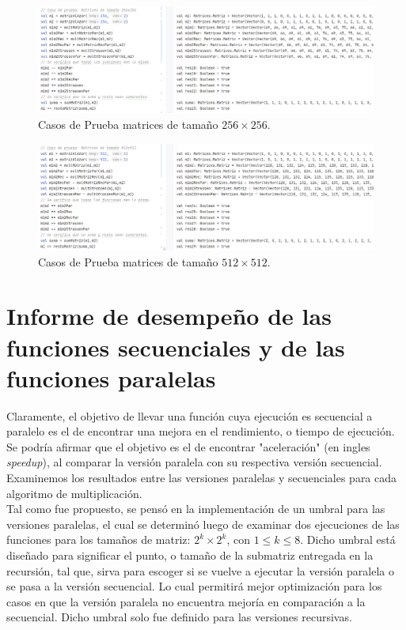 \documentclass{article}
\begin{document}
\begin{figure}[h]
    \begin{minipage}{1\textwidth}
        \centering
        \includegraphics[scale=0.52]{Pruebas4.png}
        \caption{Casos de Prueba matrices de tamaño \(256 \times 256\).}
        \label{1}
    \end{minipage}
\end{figure}

\begin{figure}[h]
    \begin{minipage}{1\textwidth}
        \centering
        \includegraphics[scale=0.52]{Pruebas5.png}
        \caption{Casos de Prueba matrices de tamaño \(512 \times 512\).}
        \label{1}
    \end{minipage}
\end{figure}

\clearpage 
\section{Informe de desempeño de las funciones secuenciales y de las funciones paralelas}

Claramente, el objetivo de llevar una función cuya ejecución es secuencial a paralelo es el de encontrar una mejora en el rendimiento, o tiempo de ejecución. Se podría afirmar que el objetivo es el de encontrar "aceleración" (en ingles \textit{speedup}), al comparar la versión paralela con su respectiva versión secuencial. Examinemos los resultados entre las versiones paralelas y secuenciales para cada algoritmo de multiplicación. \\

Tal como fue propuesto, se pensó en la implementación de un umbral para las versiones paralelas, el cual se determinó luego de examinar dos ejecuciones de las funciones para los tamaños de matriz: \(2^k \times 2^k\), con \(1 \leq k \leq 8\). Dicho umbral está diseñado para significar el punto, o tamaño de la submatriz entregada en la recursión, tal que, sirva para escoger si se vuelve a ejecutar la versión paralela o se pasa a la versión secuencial. Lo cual permitirá mejor optimización para los casos en que la versión paralela no encuentra mejoría en comparación a la secuencial. Dicho umbral solo fue definido para las versiones recursivas.
\end{document}

